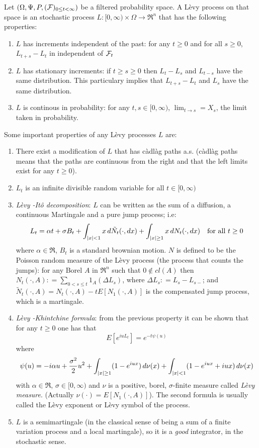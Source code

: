 \documentclass[12pt]{article}
\def\cadlag{c\`adl\`ag }
\def\ito{It\^o }
\def\levy{L\`evy }
\begin{document}
Let $(\Omega,\Psi,P,({\cal F})_{0\le t<\infty})$ be a filtered
probability space. A \levy process on that space is an stochastic
process $L\colon[0,\infty)\times\Omega\rightarrow \Re^n$ that has the
following properties:
\begin{enumerate}
\item $L$ has increments independent of the past: for any $t\ge 0$ and for all $s\ge 0$, $L_{t+s}-L_t$ in independent of ${\cal F}_t$
\item $L$ has stationary increments: if $t\ge s\ge 0$ then $L_t-L_s$ and $L_{t-s}$ have the same distribution. This particulary implies that $L_{t+s}-L_{t}$ and $L_{s}$ have the same distribution.
\item $L$ is continous in probability: for any $t,s\in [0,\infty)$, $\lim_{t\rightarrow s}=X_s$, the limit taken in probability.
\end{enumerate}
\vskip 0.5pc

Some important properties of any \levy processes $L$ are:
\begin{enumerate}
\item There exist a modification of $L$ that has \cadlag paths a.s. (\cadlag paths means that the paths are continuous from the right and that the left limits exist for any $t\ge 0$).
\item $L_t$ is an infinite divisible random variable for all $t\in [0,\infty)$
\item {\it \levy-\ito decomposition}: $L$ can be written as the sum of a diffusion, a continuous Martingale and a pure jump process; i.e:$$L_t=\alpha t+\sigma B_t+\int_{\vert x\vert<1}x\,d\tilde N_t(\cdot,dx)+\int_{\vert x\vert\ge 1}x\,dN_t(\cdot,dx)\quad \hbox{for all $t\ge 0$}$$where $\alpha \in \Re$, $B_t$ is a standard brownian motion. $N$ is defined to be the Poisson random measure of the \levy process (the process that counts the jumps): for any Borel $A$ in $\Re^n$ such that $0 \notin cl(A)$ then $N_t(\cdot,A)\colon= \sum_{0<s\le t}1_{A}(\Delta L_s)$, where $\Delta L_s\colon= L_s-L_{s-}$; and $\tilde N_t(\cdot,A)=N_t(\cdot,A)-tE[N_1(\cdot,A)]$ is the compensated jump process, which is a martingale.
\item {\it \levy-Khintchine formula}: from the previous property it can be shown that for any $t\ge 0$ one has that$$E[e^{iuL_t}]=e^{-t\psi(u)}$$where$$\psi(u)=-i\alpha u+{\sigma^2 \over 2}u^2+\int_{\vert x\vert \ge 1}(1-e^{iux})\,d\nu(x)+\int_{\vert x\vert<1}(1-e^{iux}+iux)\,d\nu(x)$$with $\alpha\in \Re$, $\sigma \in [0,\infty)$ and $\nu$ is a positive, borel, $\sigma$-finite measure called {\it \levy measure}. (Actually $\nu(\cdot)=E[N_1(\cdot,A)]$). The second formula is usually called the \levy exponent or \levy symbol of the process.
\item $L$ is a semimartingale (in the classical sense of being a sum of a finite variation process and a local martingale), so it is a {\it good} integrator, in the stochastic sense.
\end{enumerate}
\end{document}
